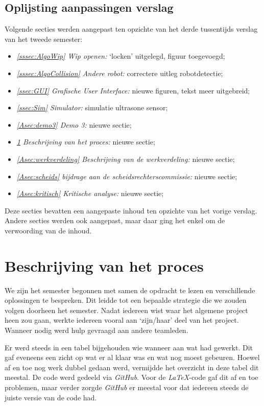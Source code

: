 \documentclass[eind]{penoverslag}
\begin{document}
\subsection{Oplijsting aanpassingen verslag}
\label{Assec:aanp3}
Volgende secties werden aangepast ten opzichte van het derde tussentijds verslag van het tweede semester:

\begin{itemize}
	\item \textit{\ref{sssec:AlgoWip} Wip openen:} `locken' uitgelegd, figuur toegevoegd;
	\item \textit{\ref{sssec:AlgoCollision} Andere robot:} correctere uitleg robotdetectie;
	\item \textit{\ref{ssec:GUI} Grafische User Interface:} nieuwe figuren, tekst meer uitgebreid;
	\item \textit{\ref{ssec:Sim} Simulator:} simulatie ultrasone sensor;
	\item \textit{\ref{Asec:demo3} Demo 3:} nieuwe sectie;
	\item \textit{\ref{Asec:beschrijvingProces} Beschrijving van het proces:} nieuwe sectie;
	\item \textit{\ref{Asec:werkverdeling} Beschrijving van de werkverdeling:} nieuwe sectie;
	\item \textit{\ref{Asec:scheids} bijdrage aan de scheidsrechterscommissie:} nieuwe sectie;
	\item \textit{\ref{Asec:kritisch} Kritische analyse:} nieuwe sectie;
\end{itemize}

Deze secties bevatten een aangepaste inhoud ten opzichte van het vorige verslag. Andere secties werden ook aangepast, maar daar ging het enkel om de verwoording van de inhoud.

\section{Beschrijving van het proces}
\label{Asec:beschrijvingProces}

We zijn het semester begonnen met samen de opdracht te lezen en verschillende oplossingen te bespreken. Dit leidde tot een bepaalde strategie \cite{Strategie} die we zouden volgen doorheen het semester. Nadat iedereen wist waar het algemene project heen zou gaan, werkte iedereen vooral aan `zijn/haar' deel van het project. Wanneer nodig werd hulp gevraagd aan andere teamleden.

Er werd steeds in een tabel bijgehouden wie wanneer aan wat had gewerkt. Dit gaf eveneens een zicht op wat er al klaar was en wat nog moest gebeuren. Hoewel af en toe nog werk dubbel gedaan werd, vermijdde het overzicht in deze tabel dit meestal.
De code werd gedeeld via \textit{GitHub}. Voor de \textit{LaTeX}-code gaf dit af en toe problemen, maar verder zorgde \textit{GitHub} er meestal voor dat iedereen steeds de juiste versie van de code had.
\end{document}
